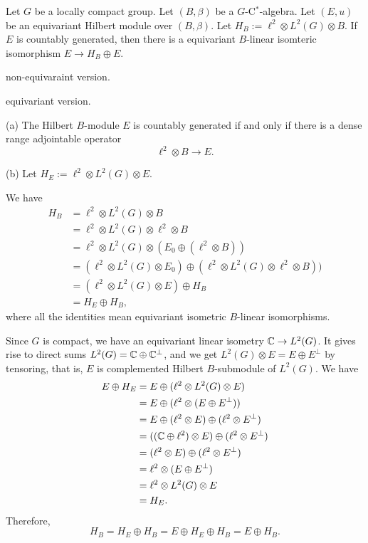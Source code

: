 \documentclass{../../large}
\begin{document}
\begin{prb}
Let $G$ be a locally compact group.
Let $(B,\beta)$ be a $G$-C$^*$-algebra.
Let $(E,u)$ be an equivariant Hilbert module over $(B,\beta)$.
Let $H_B:=\ell^2\otimes L^2(G)\otimes B$.
If $E$ is countably generated, then there is a equivariant $B$-linear isomteric isomorphism $E\to H_B\oplus E$.
\begin{parts}
\item non-equivaraint version.
\item equivariant version.
\end{parts}
\end{prb}
\begin{pf}
(a)
The Hilbert $B$-module $E$ is countably generated if and only if there is a dense range adjointable operator
\[\ell^2\otimes B\to E.\]


(b)
Let $H_E:=\ell^2\otimes L^2(G)\otimes E$.

We have
\begin{align*}
H_B
&=\ell^2\otimes L^2(G)\otimes B\\
&=\ell^2\otimes L^2(G)\otimes\ell^2\otimes B\\
&=\ell^2\otimes L^2(G)\otimes(E_0\oplus(\ell^2\otimes B))\\
&=(\ell^2\otimes L^2(G)\otimes E_0)\oplus(\ell^2\otimes L^2(G)\otimes\ell^2\otimes B))\\
&=(\ell^2\otimes L^2(G)\otimes E)\oplus H_B\\
&=H_E\oplus H_B,
\end{align*}
where all the identities mean equivariant isometric $B$-linear isomorphisms.

Since $G$ is compact, we have an equivariant linear isometry $\mathbb{C}\to L^2(G)$.
It gives rise to direct sums $L^2(G)=\mathbb{C}\oplus \mathbb{C}^\perp$, and we get $L^2(G)\otimes E=E\oplus E^\perp$ by tensoring, that is, $E$ is complemented Hilbert $B$-submodule of $L^2(G)$.
We have
\begin{align*}
E\oplus H_E
&=E\oplus(\ell^2\otimes L^2(G)\otimes E)\\
&=E\oplus(\ell^2\otimes(E\oplus E^\perp))\\
&=E\oplus(\ell^2\otimes E)\oplus(\ell^2\otimes E^\perp)\\
&=((\mathbb{C}\oplus\ell^2)\otimes E)\oplus(\ell^2\otimes E^\perp)\\
&=(\ell^2\otimes E)\oplus(\ell^2\otimes E^\perp)\\
&=\ell^2\otimes(E\oplus E^\perp)\\
&=\ell^2\otimes L^2(G)\otimes E\\
&=H_E.
\end{align*}
Therefore,
\[H_B=H_E\oplus H_B=E\oplus H_E\oplus H_B=E\oplus H_B.\]
\end{pf}
\end{document}
